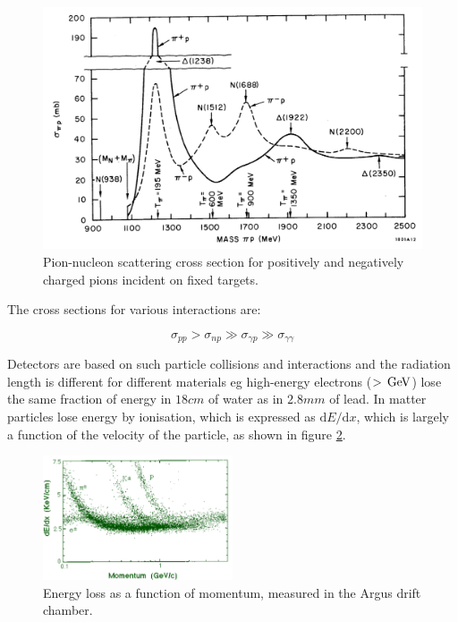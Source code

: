 \begin{figure}[!htb]
  \begin{center}
    \includegraphics[width=\textwidth]{images/chapter_2/pionNucleonScattering.pdf}
    \caption[Pion-nucleon scattering cross section]{Pion-nucleon scattering cross section for positively and negatively charged pions incident on fixed targets. \cite{pionNucleonScattering}}
    \label{fig:ch2_pionNucleonScattering}
  \end{center}
\end{figure}

The cross sections for various interactions are:

\[
  \sigma_{pp} > \sigma_{np} \gg \sigma_{\gamma p} \gg \sigma_{\gamma \gamma}
\]

Detectors are based on such particle collisions and interactions and the radiation length is different for different materials eg high-energy electrons ($> \mathrm{\,GeV}$) lose the same fraction of energy in $18 cm$ of water as in $2.8mm$ of lead.  In matter particles lose energy by ionisation, which is expressed as $\mathrm{d}E / \mathrm{d} x$, which is largely a function of the velocity of the particle, as shown in figure \ref{fig:ch2_energyLoss}.

\begin{figure}[!htb]
  \begin{center}
    \includegraphics[width=0.5\textwidth]{images/chapter_2/Argus.pdf}
    \caption[Energy loss as a function of momentum]{Energy loss as a function of momentum, measured in the Argus drift chamber. \cite{energyLoss}}
    \label{fig:ch2_energyLoss}
  \end{center}
\end{figure}

